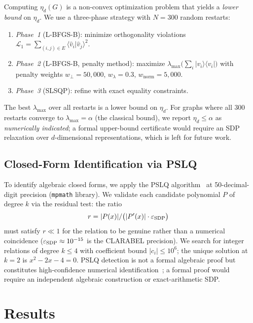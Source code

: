 \documentclass[aps,pra,twocolumn,superscriptaddress,longbibliography,floatfix]{revtex4-2}
\newcommand{\al}{\alpha}
\newcommand{\lmax}{\lambda_{\max}}
\begin{document}
Computing $\eta_d(G)$ is a non-convex optimization problem that yields a
\emph{lower bound} on $\eta_d$.
We use a three-phase strategy with $N=300$ random restarts:
\begin{enumerate}
  \item \emph{Phase~1} (L-BFGS-B): minimize orthogonality violations
        $\mathcal{L}_1 = \sum_{(i,j)\in E}\langle\hat{v}_i|\hat{v}_j\rangle^2$.
  \item \emph{Phase~2} (L-BFGS-B, penalty method): maximize
        $\lmax\!\bigl(\sum_i|v_i\rangle\!\langle v_i|\bigr)$ with penalty
        weights $w_\perp=50{,}000$, $w_\lambda=0.3$, $w_\mathrm{norm}=5{,}000$.
  \item \emph{Phase~3} (SLSQP): refine with exact equality constraints.
\end{enumerate}
The best $\lmax$ over all restarts is a lower bound on $\eta_d$.
For graphs where all 300 restarts converge to $\lmax=\al$ (the classical
bound), we report $\eta_d\leq\al$ as \emph{numerically indicated}; a
formal upper-bound certificate would require an SDP relaxation over
$d$-dimensional representations, which is left for future work.

\subsection{Closed-Form Identification via PSLQ}

To identify algebraic closed forms, we apply the PSLQ
algorithm~\cite{Bailey1999} at 50-decimal-digit precision
(\texttt{mpmath} library).
We validate each candidate polynomial $P$ of degree $k$ via the residual
test: the ratio
\begin{equation}
  r = |P(x)|/\bigl(|P'(x)|\cdot\varepsilon_{\rm SDP}\bigr)
\end{equation}
must satisfy $r\ll 1$ for the relation to be genuine rather than a
numerical coincidence ($\varepsilon_{\rm SDP}\approx10^{-15}$ is the
CLARABEL precision).
We search for integer relations of degree $k\leq4$ with coefficient bound
$|c_i|\leq10^6$; the unique solution at $k=2$ is $x^2-2x-4=0$.
PSLQ detection is not a formal algebraic proof but constitutes high-confidence
numerical identification~\cite{Bailey1999}; a formal proof would require
an independent algebraic construction or exact-arithmetic SDP.

\section{Results}
\label{sec:results}
\end{document}

